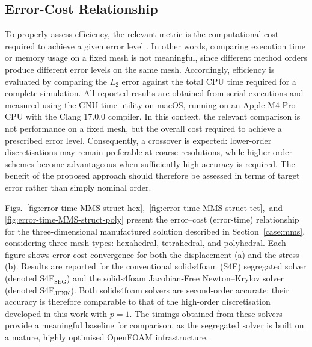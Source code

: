 \documentclass[review,3p]{elsarticle}
\begin{document}
\subsection{Error-Cost Relationship}
\label{case:error_cost_relationship}
%
To properly assess efficiency, the relevant metric is the computational cost required to achieve a given error level \cite{wang2013}. 
In other words, comparing execution time or memory usage on a fixed mesh is not meaningful, since different method orders produce different error levels on the same mesh. Accordingly, efficiency is evaluated by comparing the $L_2$ error against the total CPU time required for a complete simulation.
All reported results are obtained from serial executions and measured using the GNU time utility on macOS, running on an Apple M4 Pro CPU with the Clang 17.0.0 compiler. {\color{orange}In this context, the relevant comparison is not performance on a fixed mesh, but the overall cost required to achieve a prescribed error level. Consequently, a crossover is expected: lower-order discretisations may remain preferable at coarse resolutions, while higher-order schemes become advantageous when sufficiently high accuracy is required. The benefit of the proposed approach should therefore be assessed in terms of target error rather than simply nominal order.}


Figs.~\ref{fig:error-time-MMS-struct-hex},~\ref{fig:error-time-MMS-struct-tet},~and \ref{fig:error-time-MMS-struct-poly} present the error–cost (error-time) relationship for the three-dimensional manufactured solution described in Section~\ref{case:mms}, considering three mesh types: hexahedral, tetrahedral, and polyhedral. 
Each figure shows error-cost convergence for both the displacement (a) and the stress (b). Results are reported for the conventional solids4foam (S4F) segregated solver (denoted 
S4F$_{\text{SEG}}$) and the solids4foam Jacobian-Free Newton–Krylov solver (denoted S4F$_{\text{JFNK}}$). Both solids4foam solvers are second-order accurate; their accuracy is therefore comparable to that of the high-order discretisation developed in this work with $p=1$. The timings obtained from these solvers provide a meaningful baseline for comparison, as the segregated solver is built on a mature, highly optimised OpenFOAM infrastructure.
\end{document}
